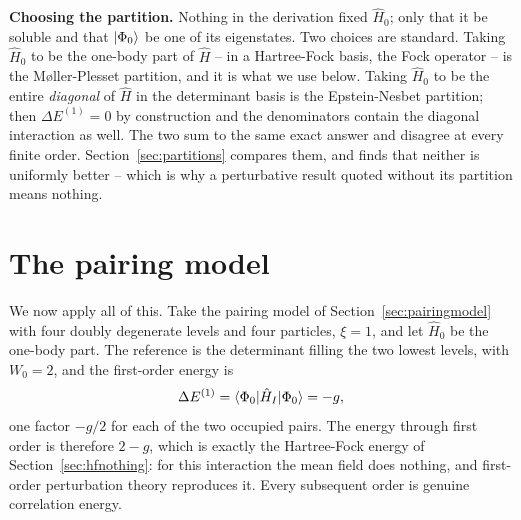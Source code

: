 \begin{notebox}
\textbf{Choosing the partition.}  Nothing in the derivation fixed
$\hat{H}_0$; only that it be soluble and that $\vert \Phi_0 \rangle$ be one of its
eigenstates.  Two choices are standard.  Taking $\hat{H}_0$ to be the
one-body part of $\hat{H}$ -- in a Hartree-Fock basis, the Fock operator --
is the M\o{}ller-Plesset partition, and it is what we use below.  Taking
$\hat{H}_0$ to be the entire \emph{diagonal} of $\hat{H}$ in the determinant
basis is the Epstein-Nesbet partition; then $\Delta E^{(1)}=0$ by
construction and the denominators contain the diagonal interaction as well.
The two sum to the same exact answer and disagree at every finite order.
Section~\ref{sec:partitions} compares them, and finds that neither is
uniformly better -- which is why a perturbative result quoted without its
partition means nothing.
\end{notebox}

\section{The pairing model}
\label{sec:mbptpairing}

We now apply all of this.  Take the pairing model of
Section~\ref{sec:pairingmodel} with four doubly degenerate levels and four
particles, $\xi=1$, and let $\hat{H}_0$ be the one-body part.  The reference
is the determinant filling the two lowest levels, with $W_0=2$, and the
first-order energy is
\begin{equation}
  \Delta E^{(1)} = \langle \Phi_0 | \hat{H}_I | \Phi_0 \rangle = -g,
  \label{eq:9-pairingE1}
\end{equation}
one factor $-g/2$ for each of the two occupied pairs.  The energy through
first order is therefore $2-g$, which is exactly the Hartree-Fock energy of
Section~\ref{sec:hfnothing}: for this interaction the mean field does
nothing, and first-order perturbation theory reproduces it.  Every subsequent
order is genuine correlation energy.

